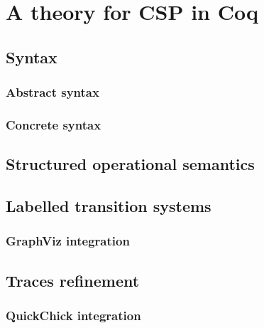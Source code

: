 \chapter{A theory for CSP in Coq}

\section{Syntax}

\subsection{Abstract syntax}

\subsection{Concrete syntax}

\section{Structured operational semantics}

\section{Labelled transition systems}

\subsection{GraphViz integration}

\section{Traces refinement}

\subsection{QuickChick integration}
